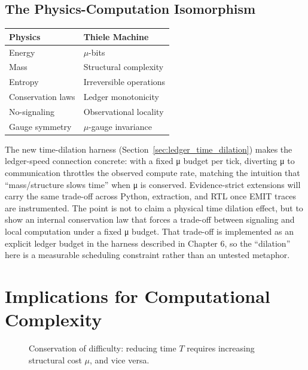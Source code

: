 \subsection{The Physics-Computation Isomorphism}

\begin{center}
\begin{tabular}{|l|l|}
\hline
\textbf{Physics} & \textbf{Thiele Machine} \\
\hline
Energy & $\mu$-bits \\
Mass & Structural complexity \\
Entropy & Irreversible operations \\
Conservation laws & Ledger monotonicity \\
No-signaling & Observational locality \\
Gauge symmetry & $\mu$-gauge invariance \\
\hline
\end{tabular}
\end{center}

The new time-dilation harness (Section~\ref{sec:ledger_time_dilation}) makes the ledger-speed connection concrete: with a fixed μ budget per tick, diverting μ to communication throttles the observed compute rate, matching the intuition that “mass/structure slows time” when μ is conserved. Evidence-strict extensions will carry the same trade-off across Python, extraction, and RTL once EMIT traces are instrumented. The point is not to claim a physical time dilation effect, but to show an internal conservation law that forces a trade-off between signaling and local computation under a fixed μ budget.
That trade-off is implemented as an explicit ledger budget in the harness described in Chapter 6, so the “dilation” here is a measurable scheduling constraint rather than an untested metaphor.

\section{Implications for Computational Complexity}

\begin{figure}[h]
\centering
{}
\caption{Conservation of difficulty: reducing time $T$ requires increasing structural cost $\mu$, and vice versa.}
\label{fig:difficulty-conservation}
\end{figure}

